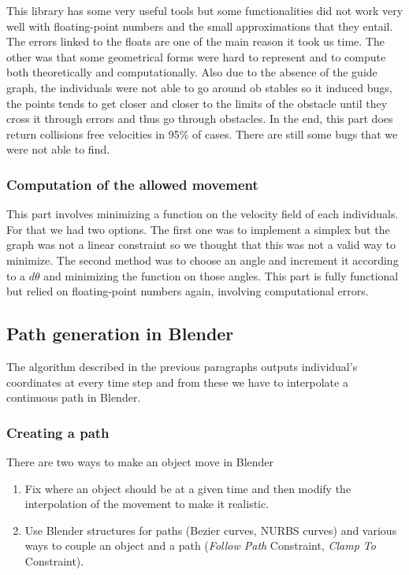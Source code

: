 This library has some very useful tools but some functionalities did not work very well with floating-point numbers and the small approximations that they entail. The errors linked to the floats are one of the main reason it took us time. %
The other was that some geometrical forms were hard to represent and to compute both theoretically and computationally.
Also due to the absence of the guide graph, the individuals were not able to go around ob stables so it induced bugs, the points tends to get closer and closer to the limits of the obstacle until they cross it through errors and thus go through obstacles.
In the end, this part does return collisions free velocities in 95\% of cases. There are still some bugs that we were not able to find.

\subsubsection{Computation of the allowed movement}

This part involves minimizing a function on the velocity field of each individuals. For that we had two options. The first one was to implement a simplex but the graph was not a linear constraint so we thought that this was not a valid way to minimize.
 The second method was to choose an angle and increment it according to a $d\theta$ and minimizing the function on those angles.
This part is fully functional but relied on floating-point numbers again, involving computational errors.


\subsection{Path generation in Blender}

The algorithm described in the previous paragraphs outputs individual's coordinates at every time step and from these we have to interpolate a continuous path in Blender. 


\subsubsection{Creating a path}

There are two ways to make an object move in Blender
\begin{enumerate}
\item Fix where an object should be at a given time and then modify the interpolation of the movement to make it realistic.  
\item Use Blender structures for paths (Bezier curves, NURBS curves) and various ways to couple an object and a path (\textit{Follow Path} Constraint, \textit{Clamp To} Constraint).
\end{enumerate} 

